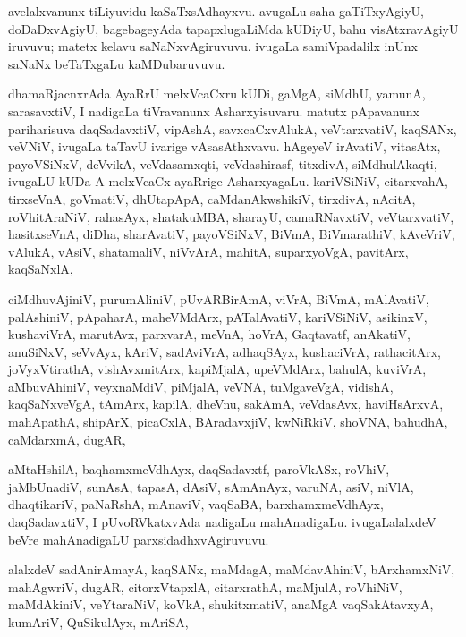 \documentclass{article}
\begin{document}
\begin{mn}
avelalxvanunx tiLiyuvidu kaSaTxsAdhayxvu. avugaLu saha gaTiTxyAgiyU, 
doDaDxvAgiyU, bagebageyAda tapapxlugaLiMda kUDiyU, bahu visAtxravAgiyU iruvuvu; 
matetx kelavu saNaNxvAgiruvuvu. ivugaLa samiVpadalilx inUnx saNaNx beTaTxgaLu
kaMDubaruvuvu.
\end{mn}

\begin{mn}
dhamaRjacnxrAda AyaRrU melxVcaCxru kUDi, gaMgA, siMdhU, yamunA, sarasavxtiV, I nadigaLa 
tiVravanunx Asharxyisuvaru. matutx pApavanunx pariharisuva daqSadavxtiV, vipAshA,
savxcaCxvAlukA, veVtarxvatiV, kaqSANx, veVNiV, ivugaLa taTavU ivarige vAsasAthxvavu. 
hAgeyeV irAvatiV, vitasAtx, payoVSiNxV, deVvikA, veVdasamxqti, veVdashirasf, titxdivA,
siMdhulAkaqti, ivugaLU kUDa A melxVcaCx ayaRrige AsharxyagaLu.
kariVSiNiV, citarxvahA, tirxseVnA, goVmatiV, dhUtapApA, caMdanAkwshikiV,
tirxdivA, nAcitA, roVhitAraNiV, rahasAyx, shatakuMBA, sharayU, 
camaRNavxtiV, veVtarxvatiV, hasitxseVnA, diDha, sharAvatiV, payoVSiNxV, 
BiVmA, BiVmarathiV, kAveVriV, vAlukA, vAsiV, shatamaliV, niVvArA, mahitA, 
suparxyoVgA, pavitArx, kaqSaNxlA, 
\end{mn}

\begin{mn}
ciMdhuvAjiniV, purumAliniV, pUvARBirAmA, viVrA, BiVmA, mAlAvatiV, palAshiniV,
pApaharA, maheVMdArx, pATalAvatiV, kariVSiNiV, asikinxV, kushaviVrA, marutAvx,
parxvarA, meVnA, hoVrA, Gaqtavatf, anAkatiV, anuSiNxV, seVvAyx, kAriV,
sadAviVrA, adhaqSAyx, kushaciVrA, rathacitArx, joVyxVtirathA, vishAvxmitArx,
kapiMjalA, upeVMdArx, bahulA, kuviVrA, aMbuvAhiniV, veyxnaMdiV, piMjalA, veVNA, tuMgaveVgA,
vidishA, kaqSaNxveVgA, tAmArx, kapilA, dheVnu, sakAmA, veVdasAvx, haviHsArxvA, mahApathA,
shipArX, picaCxlA, BAradavxjiV, kwNiRkiV, shoVNA, bahudhA, caMdarxmA, dugAR,
\end{mn}

\begin{mn}
aMtaHshilA, baqhamxmeVdhAyx, daqSadavxtf, paroVkASx, roVhiV, jaMbUnadiV, sunAsA, tapasA, dAsiV,
sAmAnAyx, varuNA, asiV, niVlA, dhaqtikariV, paNaRshA, mAnaviV, vaqSaBA, barxhamxmeVdhAyx,
daqSadavxtiV, I pUvoRVkatxvAda nadigaLu mahAnadigaLu. ivugaLalalxdeV 
beVre mahAnadigaLU parxsidadhxvAgiruvuvu.
\end{mn}

\begin{mn}
alalxdeV sadAnirAmayA, kaqSANx, maMdagA, maMdavAhiniV, bArxhamxNiV, mahAgwriV, dugAR,
citorxVtapxlA, citarxrathA, maMjulA, roVhiNiV, maMdAkiniV, veYtaraNiV, koVkA, shukitxmatiV, anaMgA
vaqSakAtavxyA, kumAriV, QuSikulAyx, mAriSA,
\end{mn}
\end{document}
